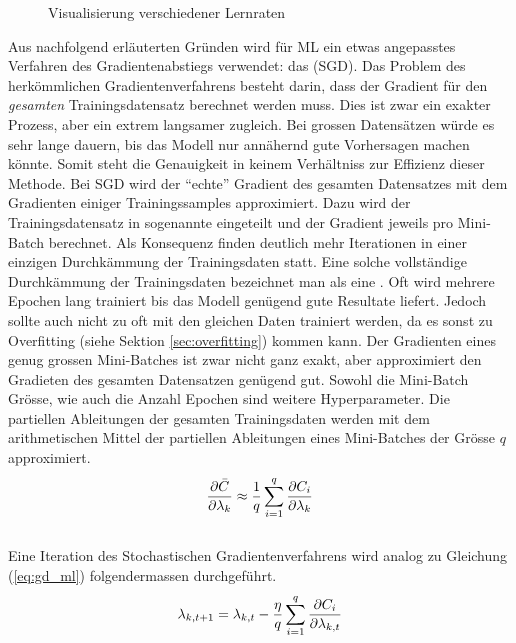 \begin{figure}[h!]
  \centering
  \caption{Visualisierung verschiedener Lernraten}
\end{figure}

Aus nachfolgend erläuterten Gründen wird für ML ein etwas angepasstes
Verfahren des Gradientenabstiegs verwendet: das  (SGD).
Das Problem des herkömmlichen Gradientenverfahrens besteht darin, dass der
Gradient für den \textit{gesamten} Trainingsdatensatz berechnet werden muss.
Dies ist zwar ein exakter Prozess, aber ein extrem langsamer zugleich.
Bei grossen Datensätzen würde es sehr lange dauern, bis das Modell nur annähernd gute Vorhersagen machen könnte.
Somit steht die Genauigkeit in keinem Verhältniss zur Effizienz dieser Methode.
\para{}
Bei SGD wird der ``echte'' Gradient des gesamten Datensatzes mit dem Gradienten einiger Trainingssamples approximiert.
Dazu wird der Trainingsdatensatz in sogenannte  eingeteilt und der Gradient jeweils pro Mini-Batch berechnet.
Als Konsequenz finden deutlich mehr Iterationen in einer einzigen
Durchkämmung der Trainingsdaten statt. Eine solche vollständige Durchkämmung der Trainingsdaten
bezeichnet man als eine .
Oft wird mehrere Epochen lang trainiert bis das Modell genügend gute Resultate
liefert. Jedoch sollte auch nicht zu oft mit den gleichen Daten trainiert
werden, da es sonst zu Overfitting (siehe Sektion \ref{sec:overfitting}) kommen kann.
Der Gradienten eines genug grossen Mini-Batches ist zwar nicht ganz exakt, aber approximiert den Gradieten des gesamten Datensatzen genügend gut.
Sowohl die Mini-Batch Grösse, wie auch die Anzahl Epochen sind weitere Hyperparameter.
\para{}
Die partiellen Ableitungen der gesamten Trainingsdaten werden mit dem
arithmetischen Mittel der partiellen Ableitungen eines Mini-Batches der Grösse $q$ approximiert.
\\
\begin{equation}\label{eq:minibatch_deriv}
  \frac{\partial \bar{C}}{\partial \lambda_k} \approx \frac{1}{q}\sum_{i=1}^{q} \frac{\partial C_i}{\partial \lambda_k}
\end{equation}
\\
Eine Iteration des Stochastischen Gradientenverfahrens wird analog zu Gleichung (\ref{eq:gd_ml}) folgendermassen durchgeführt.
\\
\begin{equation}\label{eq:sgd}
  \lambda_{k,t+1} = \lambda_{k,t} - \frac{\eta}{q} \sum_{i=1}^{q} \frac{\partial C_i}{\partial \lambda_{k,t}}
\end{equation}

